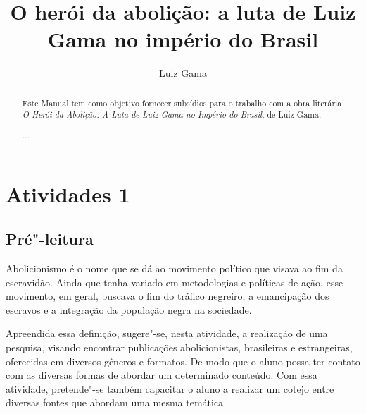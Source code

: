 \documentclass[12pt]{extarticle}
\begin{document}
\newcommand{\AutorLivro}{Luiz Gama}
\newcommand{\TituloLivro}{O herói da abolição: a luta de Luiz Gama no império do Brasil}
\newcommand{\Tema}{Diálogos com a sociologia e com a antropologia}
\newcommand{\Genero}{Diário, biografia, autobiografia, relatos, memórias}
\newcommand{\imagemCapa}{./images/PNLD0016-01.png}
\newcommand{\issnppub}{---}
\newcommand{\issnepub}{---}
\newcommand{\colaborador}{\textbf{Eduardo Modesto de Carvalho, Bruno Gradella e Vicente Castro} é uma pessoa incrível e vai fazer um bom serviço.}


\title{\TituloLivro}
\author{\AutorLivro}
\def\authornotes{\colaborador}

\date{}
\maketitle

\begin{abstract}
Este Manual tem como objetivo fornecer subsídios para o trabalho com a
obra literária \emph{O Herói da Abolição: A Luta de Luiz Gama no Império
do Brasil}, de Luiz Gama.

...
\end{abstract}

\tableofcontents


\section{Atividades 1}


\subsection{Pré"-leitura}


Abolicionismo é o nome que se dá ao movimento político que
visava ao fim da escravidão. Ainda que tenha variado em metodologias e
políticas de ação, esse movimento, em geral, buscava o fim do tráfico
negreiro, a emancipação dos escravos e a integração da população negra
na sociedade.

Apreendida essa definição, sugere"-se, nesta atividade, a realização de
uma pesquisa, visando encontrar publicações abolicionistas, brasileiras
e estrangeiras, oferecidas em diversos gêneros e formatos. De modo que o
aluno possa ter contato com as diversas formas de abordar um determinado
conteúdo. Com essa atividade, pretende"-se também capacitar o aluno a
realizar um cotejo entre diversas fontes que abordam uma mesma temática
\end{document}
